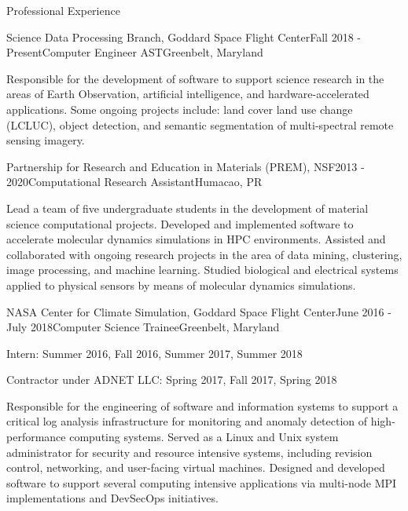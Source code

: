 \documentclass{resume} %
\begin{document}
\begin{rSection}{Professional Experience}

\begin{rSubsection}{Science Data Processing Branch, Goddard Space Flight Center}{Fall 2018 - Present}{Computer Engineer AST}{Greenbelt, Maryland}

Responsible for the development of software to support science research in the areas of Earth Observation, artificial intelligence, and hardware-accelerated applications. Some ongoing projects include: land cover land use change (LCLUC), object detection, and semantic segmentation of multi-spectral remote sensing imagery.
\end{rSubsection}


\begin{rSubsection}{Partnership for Research and Education in Materials (PREM), NSF}{2013 - 2020}{Computational Research Assistant}{Humacao, PR}
\item Lead a team of five undergraduate students in the development of material science computational projects. Developed and implemented software to accelerate molecular dynamics simulations in HPC environments. Assisted and collaborated with ongoing research projects in the area of data mining, clustering, image processing, and machine learning. Studied biological and electrical systems applied to physical sensors by means of molecular dynamics simulations.
\end{rSubsection}

\begin{rSubsection}{NASA Center for Climate Simulation, Goddard Space Flight Center}{June 2016 - July 2018}{Computer Science Trainee}{Greenbelt, Maryland}
\item[] Intern: Summer 2016, Fall 2016, Summer 2017, Summer 2018
\item[] Contractor under ADNET LLC: Spring 2017, Fall 2017, Spring 2018
\item Responsible for the engineering of software and information systems to support a critical log analysis infrastructure for monitoring and anomaly detection of high-performance computing systems. Served as a Linux and Unix system administrator for security and resource intensive systems, including revision control, networking, and user-facing virtual machines. Designed and developed software to support several computing intensive applications via multi-node MPI implementations and DevSecOps initiatives.
\end{rSubsection}

\end{rSection}
\end{document}
